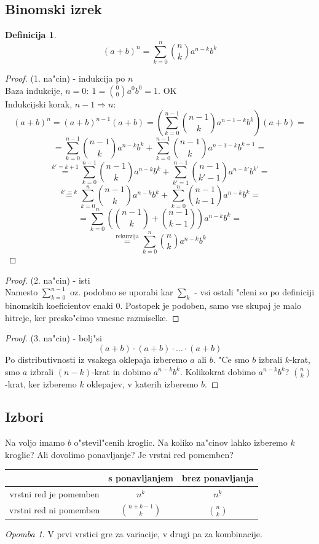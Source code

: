 \documentclass[a4paper,12pt]{article}
\theoremstyle{definition}
\newtheorem{defn}[counter]{Definicija}
\theoremstyle{remark}
\newtheorem*{rem}{Opomba}
\begin{document}
\subsection{Binomski izrek}
\begin{defn}
\[(a + b)^n = \sum_{k = 0}^{n}{\binom{n}{k} a^{n-k} b^k}\]
\end{defn}
\begin{proof}(1. na"cin) - indukcija po $n$\\
	Baza indukcije, $n = 0: \ 1 = \binom{0}{0} a^0b^0 = 1$. OK\\
	Indukcijski korak, $n - 1 \Rightarrow n$:
\[(a+b)^n = (a+b)^{n-1}(a+b) = (\sum_{k=0}^{n-1} \binom{n-1}{k} a^{n-1-k}b^k)(a+b) =\]
\[ = \sum_{k=0}^{n-1} \binom{n-1}{k} a^{n-k}b^k + \sum_{k=0}^{n-1} \binom{n-1}{k} a^{n-1-k}b^{k+1} =\]
\[\stackrel{k' = k + 1}{=} \sum_{k=0}^{n-1} \binom{n-1}{k} a^{n-k}b^k + \sum_{k'=1}^{n-1} \binom{n-1}{k'-1} a^{n-k'}b^{k'} = \]
\[\stackrel{k'=k}{=} \sum_{k=0}^{n} {\binom{n-1}{k}a^{n-k} b^k} + \sum_{k=0}^{n} {\binom{n-1}{k-1}a^{n-k} b^k} =\]
\[= \sum_{k=0}^n (\binom{n-1}{k} + \binom{n-1}{k-1})a^{n-k}b^k =\]
\[\stackrel{\text{rekurzija}}{=} \sum_{k=0}^n \binom{n}{k}a^{n-k}b^k\]
\end{proof}
\begin{proof}(2. na"cin) - isti\\
	Namesto $\sum_{k=0}^{n-1}$ oz. podobno se uporabi kar $\sum_k$ - vsi ostali "cleni so po definiciji binomskih koeficientov enaki 0. Postopek je podoben, samo vse skupaj je malo hitreje, ker presko"cimo vmesne razmiselke.
\end{proof}
\begin{proof}(3. na"cin) - bolj"si\\
\[(a+b) \cdot (a+b) \cdot \ldots \cdot (a+b)\]
Po distributivnosti iz vsakega oklepaja izberemo $a$ ali $b$. "Ce smo $b$ izbrali $k$-krat, smo $a$ izbrali $(n-k)$-krat in dobimo $a^{n-k}b^k$. Kolikokrat dobimo $a^{n-k}b^k$? $\binom{n}{k}$-krat, ker izberemo $k$ oklepajev, v katerih izberemo $b$.
\end{proof}


\subsection{Izbori}

Na voljo imamo $b$ o"stevil"cenih kroglic. Na koliko na"cinov lahko izberemo $k$ kroglic? Ali dovolimo ponavljanje? Je vrstni red pomemben?

\begin{tabular}{c|c|c}

 & s ponavljanjem & brez ponavljanja \\
\hline
vrstni red je pomemben & $n^k$ & $n^{\underline{k}}$\\
\hline
vrstni red ni pomemben & $\binom{n + k - 1}{k}$ & $\binom{n}{k}$
\end{tabular}
\begin{rem}
	V prvi vrstici gre za variacije, v drugi pa za kombinacije.
\end{rem}
\end{document}
